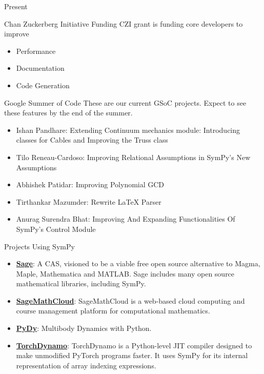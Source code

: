 \documentclass[xcolor=svgnames]{beamer}
\begin{document}
\begin{frame}{Present}
  \begin{block}{Chan Zuckerberg Initiative Funding}
    CZI grant is funding core developers to improve
    \begin{itemize}
    \item Performance
    \item Documentation
    \item Code Generation
    \end{itemize}
  \end{block}
\end{frame}

\begin{frame}{Google Summer of Code}
  These are our current GSoC projects. Expect to see these features by the end
  of the summer.
  \begin{itemize}
  \item Ishan Pandhare: Extending Continuum mechanics module: Introducing classes for Cables and Improving the Truss class
  \item Tilo Reneau-Cardoso: Improving Relational Assumptions in SymPy’s New Assumptions
  \item Abhishek Patidar: Improving Polynomial GCD
  \item Tirthankar Mazumder: Rewrite LaTeX Parser
  \item Anurag Surendra Bhat: Improving And Expanding Functionalities Of SymPy's Control Module
  \end{itemize}
\end{frame}


\begin{frame}{Projects Using SymPy}
\begin{itemize}
\item
  \href{http://www.sagemath.org/}{\textbf{Sage}}: A CAS, visioned to be
  a viable free open source alternative to Magma, Maple, Mathematica and
  MATLAB\@. Sage includes many open source mathematical libraries, including
  SymPy.
\item
  \href{https://cloud.sagemath.com}{\textbf{SageMathCloud}}:
  SageMathCloud is a web-based cloud computing and course management
  platform for computational mathematics.
\item
  \href{http://www.pydy.org/}{\textbf{PyDy}}: Multibody Dynamics with
  Python.
\item
  \href{https://pytorch.org/docs/stable/dynamo/index.html}{\textbf{TorchDynamo}}:
  TorchDynamo is a Python-level JIT compiler designed to make unmodified
  PyTorch programs faster. It uses SymPy for its internal representation of
  array indexing expressions.
\end{itemize}
  \end{frame}
\end{document}
